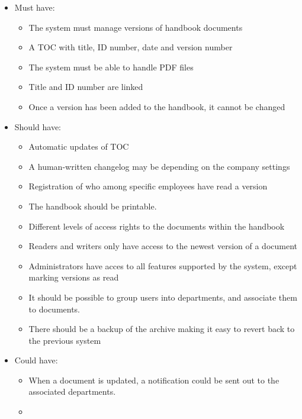 \begin{itemize}
    \item
    Must have:
        \begin{itemize}
            \item
            The system must manage versions of handbook documents
            \item
            A TOC with title, ID number, date and version number
            \item
            The system must be able to handle PDF files
            \item
            Title and ID number are linked
            \item
            Once a version has been added to the handbook, it cannot be changed
        \end{itemize}
    \newpage
    \item
    Should have:
        \begin{itemize}
			\item
			Automatic updates of TOC
            \item
            A human-written changelog may be depending on the company settings
            \item
            Registration of who among specific employees have read a version
            \item
            The handbook should be printable.
            \item
            Different levels of access rights to the documents within the handbook
            \item
            Readers and writers only have access to the newest version of a document
            \item
            Administrators have acces to all features supported by the system, except marking versions as read
            \item
            It should be possible to group users into departments, and associate them to documents.
            \item
            There should be a backup of the archive making it easy to revert back to the previous system
        \end{itemize}
    \item
    Could have:
        \begin{itemize}
            \item
            When a document is updated, a notification could be sent out to the associated departments.
            \item

\end{itemize}
\end{itemize}
